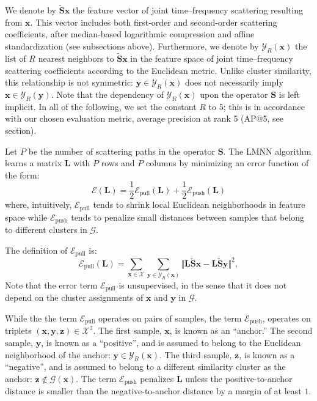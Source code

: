 \documentclass{bmcart}
\newcommand{\ja}[1]{\textcolor{purple}{JA: #1}\xspace}
\newcommand{\lnameref}[1]{%
\bgroup
\let\nmu\MakeLowercase
\nameref{#1}\egroup}
\newcommand{\nmu}{}
\begin{document}
We denote by $\mathbf{\widetilde{S}}\boldsymbol{x}$ the feature vector of joint time--frequency scattering resulting from $\boldsymbol{x}$.
This vector includes both first-order and second-order scattering coefficients, after median-based logarithmic compression and affine standardization (see subsections above).
Furthermore, we denote by $\mathcal{Y}_R (\boldsymbol{x})$ the list of $R$ nearest neighbors to $\mathbf{\widetilde{S}}\boldsymbol{x}$ in the feature space of joint time--frequency scattering coefficients according to the Euclidean metric.
Unlike cluster similarity, this relationship is not symmetric: $\boldsymbol{y}\in\mathcal{Y}_R (\boldsymbol{x})$ does not necessarily imply $\boldsymbol{x}\in\mathcal{Y}_R (\boldsymbol{y})$.
Note that the dependency of $\mathcal{Y}_R (\boldsymbol{x})$ upon the operator $\mathbf{S}$ is left implicit. %
In all of the following, we set the constant $R$ to $5$; this is in accordance with our chosen evaluation metric, average precision at rank 5 (AP@5, see \lnameref{sec:results} section).

Let $P$ be the number of scattering paths in the operator $\mathbf{S}$. The LMNN algorithm learns a matrix $\mathbf{L}$ with $P$ rows and $P$ columns by minimizing an error function of the form:
\begin{equation}
\mathcal{E}(\mathbf{L}) = \frac{1}{2} \mathcal{E}_{\textrm{pull}} (\mathbf{L}) + \frac{1}{2} \mathcal{E}_{\textrm{push}} (\mathbf{L})
\end{equation}
where, intuitively, $\mathcal{E}_{\textrm{pull}}$ tends to shrink local Euclidean neighborhoods in feature space while $\mathcal{E}_{\textrm{push}}$ tends to penalize small distances between samples that belong to different clusters in $\mathcal{G}$.

The definition of $\mathcal{E}_{\textrm{pull}}$ is:
\begin{equation}
\mathcal{E}_{\textrm{pull}} (\mathbf{L}) =
\sum_{\boldsymbol{x}\in\mathcal{X}}
\sum_{\boldsymbol{y}\in\mathcal{Y}_R (\boldsymbol{x})}
\big\Vert
\mathbf{L}\mathbf{\widetilde{S}}\boldsymbol{x} - \mathbf{L}\mathbf{\widetilde{S}}\boldsymbol{y}
\big\Vert^2,
\end{equation}
Note that the error term $\mathcal{E}_\textrm{pull}$ is unsupervised, in the sense that it does not depend on the cluster assignments of $\boldsymbol{x}$ and $\boldsymbol{y}$ in $\mathcal{G}$.

While the the term $\mathcal{E}_{\textrm{pull}}$ operates on pairs of samples, the term $\mathcal{E}_{\textrm{push}}$, operates on triplets $(\boldsymbol{x}, \boldsymbol{y}, \boldsymbol{z})\in\mathcal{X}^3$.
The first sample, $\boldsymbol{x}$, is known as an ``anchor.''
The second sample, $\boldsymbol{y}$, is known as a ``positive'', and is assumed to belong to the Euclidean neighborhood of the anchor: $\boldsymbol{y} \in \mathcal{Y}_R (\boldsymbol{x})$.
The third sample, $\boldsymbol{z}$, is known as a ``negative'', and is assumed to belong to a different similarity cluster as the anchor: $\boldsymbol{z}\not\in\mathcal{G}(\boldsymbol{x})$.
The term $\mathcal{E}_{\textrm{push}}$ penalizes $\mathbf{L}$ unless the positive-to-anchor distance is smaller than the negative-to-anchor distance by a margin of at least $1$.
\end{document}
